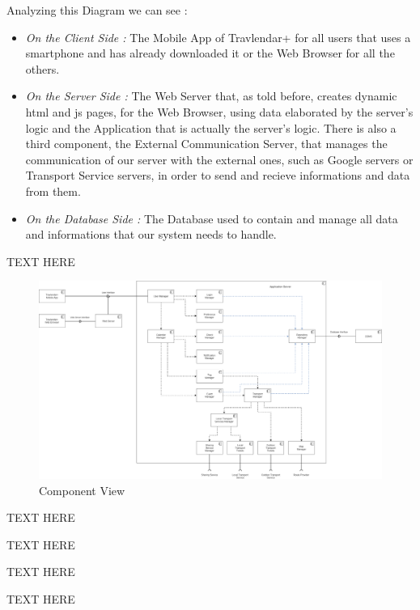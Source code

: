 Analyzing this Diagram we can see :
\begin{itemize}
	\setlength{\leftskip}{0.5cm}
	\item \emph{On the Client Side : }The Mobile App of Travlendar+ for all users that uses a smartphone and has already downloaded it or the Web Browser for all the others.
	\item \emph{On the Server Side : }The Web Server that, as told before, creates dynamic html and js pages, for the Web Browser, using data elaborated by the server's logic and the Application that is actually the server's logic. There is also a third component, the External Communication Server, that manages the communication of our server with the external ones, such as Google servers or Transport Service servers, in order to send and recieve informations and data from them.
	\item \emph{On the Database Side : }The Database used to contain and manage all data and informations that our system needs to handle.
\end{itemize}


TEXT HERE

\begin{figure}[H]
	\centering
	\includegraphics[scale=0.2]{Images/Architecture/Components_View}
	\caption{Component View}
\end{figure}


TEXT HERE


TEXT HERE


TEXT HERE


TEXT HERE